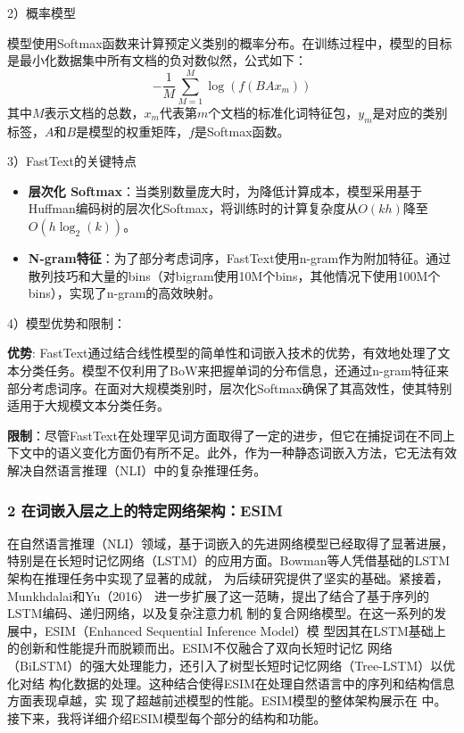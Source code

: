 2）概率模型

模型使用Softmax函数来计算预定义类别的概率分布。在训练过程中，模型的目标是最小化数据集中所有文档的负对数似然，公式如下：
\begin{equation}
  - \frac{1}{M} \sum_{M=1}^{M} \log(f(BAx_m))
\end{equation}
其中$M$表示文档的总数，$x_m$代表第$m$个文档的标准化词特征包，$y_m$是对应的类别标签，$A$和$B$是模型的权重矩阵，$f$是Softmax函数。

3）FastText的关键特点

\begin{itemize}
  \item \textbf{层次化 Softmax}：当类别数量庞大时，为降低计算成本，模型采用基于Huffman编码树的层次化Softmax，将训练时的计算复杂度从$O(kh)$降至$O(h \log_2(k))$。
  \item \textbf{N-gram特征}：为了部分考虑词序，FastText使用n-gram作为附加特征。通过散列技巧和大量的bins（对bigram使用10M个bins，其他情况下使用100M个bins），实现了n-gram的高效映射。
\end{itemize}

4）模型优势和限制：

\textbf{优势}: FastText通过结合线性模型的简单性和词嵌入技术的优势，有效地处理了文本分类任务。模型不仅利用了BoW来把握单词的分布信息，还通过n-gram特征来部分考虑词序。在面对大规模类别时，层次化Softmax确保了其高效性，使其特别适用于大规模文本分类任务。

\textbf{限制}：尽管FastText在处理罕见词方面取得了一定的进步，但它在捕捉词在不同上下文中的语义变化方面仍有所不足。此外，作为一种静态词嵌入方法，它无法有效解决自然语言推理（NLI）中的复杂推理任务。


\subsubsection*{2 在词嵌入层之上的特定网络架构：ESIM}

在自然语言推理（NLI）领域，基于词嵌入的先进网络模型已经取得了显著进展，特别是在长短时记忆网络（LSTM）的应用方面。Bowman等人\cite{bowman2016fast}凭借基础的LSTM架构在推理任务中实现了显著的成就，
为后续研究提供了坚实的基础。紧接着，Munkhdalai和Yu（2016）\cite{munkhdalai2017neural}
进一步扩展了这一范畴，提出了结合了基于序列的LSTM编码、递归网络，以及复杂注意力机
制的复合网络模型。在这一系列的发展中，ESIM（Enhanced Sequential Inference Model）模
型因其在LSTM基础上的创新和性能提升而脱颖而出。ESIM不仅融合了双向长短时记忆
网络（BiLSTM）的强大处理能力，还引入了树型长短时记忆网络（Tree-LSTM）以优化对结
构化数据的处理。这种结合使得ESIM在处理自然语言中的序列和结构信息方面表现卓越，实
现了超越前述模型的性能。ESIM模型的整体架构展示在 中。
接下来，我将详细介绍ESIM模型每个部分的结构和功能。

